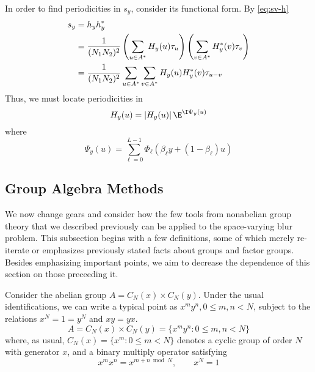 In order to find periodicities in $s_y$, consider its functional form.  By \ref{eq:sv-h}
\begin{align*}
s_y &=  h_y h_y^*\\
&= \frac{1}{(N_1N_2)^2} \left(\sum_{u\in A^*} H_y(u)\tau_u\right)
\left(\sum_{v\in A^*} H_y^*(v)\tau_v\right)\\
&=\frac{1}{(N_1N_2)^2}\sum_{u\in A^*} \sum_{v\in A^*} H_y(u)H_y^*(v)\tau_{u-v}
\end{align*}
Thus, we must locate periodicities in 
\[
H_y(u) = |H_y(u)|\,\E^{\I \Psi_y(u)}
\]
where 
\[
\Psi_y(u) = \sum_{\ell=0}^{L-1} \Phi_{\ell}(\beta_{\ell}y + (1-\beta_{\ell})u)
\]

\subsection{Group Algebra Methods}
We now change gears and consider how the few tools from nonabelian group
theory that we described previously can be applied to the space-varying blur
problem. This subsection begins with a few definitions, some of which
merely re-iterate or emphasizes previously stated facts about groups and factor
groups.  Besides emphasizing important points, we aim to decrease the
dependence of this section on those preceeding it.

Consider the abelian group $A = C_N(x) \times C_N(y)$.  Under the usual
identifications, we can write a typical point as $x^my^n, 0\leq m,n < N$,
subject to the relations $x^N = 1 = y^N$ and $xy = yx$.
\[
A = C_N(x) \times C_N(y) = \{x^m y^n : 0 \leq m,n < N \}
\]
where, as usual, $C_N(x) = \{x^m : 0 \leq m < N \}$ denotes a cyclic group of
order $N$ with generator $x$, and a binary multiply operator satisfying
\[
x^mx^n = x^{m+n \bmod N}, \qquad x^N=1
\]

